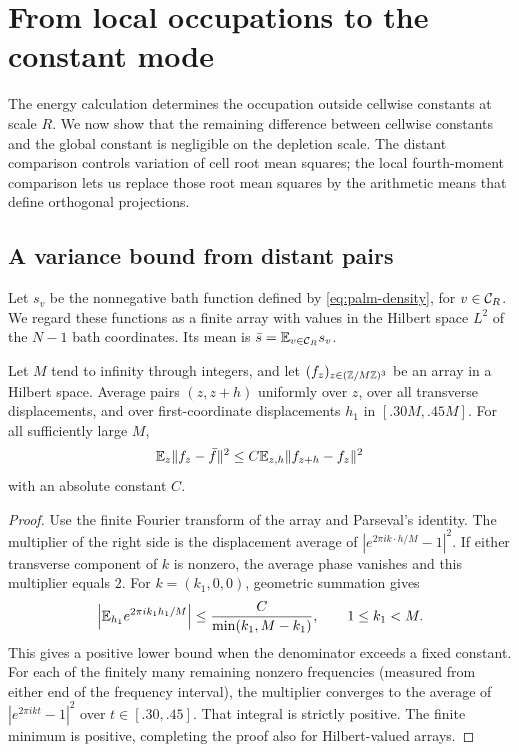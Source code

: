 \section{From local occupations to the constant mode}\label{sec:assembly}

The energy calculation determines the occupation outside cellwise constants
at scale $R$. We now show that the remaining difference between cellwise
constants and the global constant is negligible on the depletion scale.
The distant comparison controls variation of cell root mean squares;
the local fourth-moment comparison lets us replace those root mean squares
by the arithmetic means that define orthogonal projections.

\subsection{A variance bound from distant pairs}

Let $s_v$ be the nonnegative bath function defined by
\eqref{eq:palm-density}, for $v\in\mathcal C_R$. We regard these functions as a
finite array with values in the Hilbert space $L^2$ of the $N-1$ bath
coordinates. Its mean is $\bar s=\mathbb E_{v\in\mathcal C_R}s_v$.

\begin{lemma}\label{lem:distant-gap}
Let $M$ tend to infinity through integers, and let $(f_z)_{z\in(\mathbb Z/M\mathbb Z)^3}$
be an array in a Hilbert space. Average pairs $(z,z+h)$ uniformly over
$z$, over all transverse displacements, and over first-coordinate
displacements $h_1$ in $[.30M,.45M]$. For all sufficiently large $M$,
\[
 \mathbb E_z\|f_z-\bar f\|^2\le C\mathbb E_{z,h}\|f_{z+h}-f_z\|^2
\]
with an absolute constant $C$.
\end{lemma}
\begin{proof}
Use the finite Fourier transform of the array and Parseval's identity.
The multiplier of the right side is the displacement average of
$|e^{2\pi i k\cdot h/M}-1|^2$. If either transverse component of $k$
is nonzero, the average phase vanishes and this multiplier equals $2$.
For $k=(k_1,0,0)$, geometric summation gives
\[
 \left|\mathbb E_{h_1}e^{2\pi i k_1h_1/M}\right|
 \le \frac{C}{\min(k_1,M-k_1)},\qquad 1\le k_1<M.
\]
This gives a positive lower bound when the denominator exceeds a fixed
constant. For each of the finitely many remaining nonzero frequencies
(measured from either end of the frequency interval), the multiplier
converges to the average of $|e^{2\pi i kt}-1|^2$ over
$t\in[.30,.45]$. That integral is strictly positive. The finite minimum
is positive, completing the proof also for Hilbert-valued arrays.
\end{proof}


